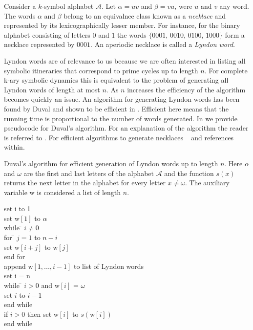 
Consider a $k$-symbol alphabet $\mathcal{A}$. Let
$\alpha=uv$ and $\beta=vu$, were $u$ and $v$ any word. The words $\alpha$
and $\beta$ belong to an equivalnce class known as a \emph{necklace} and 
represented by its 
lexicographically lesser member. 
For instance, for the binary alphabet consisting of letters $0$ and $1$
the words $\{0001,\, 0010,\, 0100,\, 1000\}$ form a necklace 
represented by $0001$. An aperiodic necklace is called a \emph{Lyndon word}.

Lyndon words are of relevance to us because we are often interested 
in listing all symbolic itineraries that correspond to prime cycles up to
length $n$. For complete k-ary symbolic dynamics this is equivalent to the problem
of generating all Lyndon words of length at most $n$. As $n$ increases the efficiency
of the algorithm becomes quickly an issue. An algorithm for generating Lyndon
words has been found by Duval  and shown to be efficient in .
Efficient here means that the running time is proportional to the number of words generated. 
In  we provide pseudocode for Duval's
algorithm. For an explanation of the algorithm the reader is referred to 
. For efficient algorithms to generate necklaces \cf~ 
and references within.

\begin{table}
	\caption{Duval's algorithm for efficient generation of Lyndon words up to length $n$. 
Here $\alpha$
and $\omega$ are the first and last letters of the alphabet $\mathcal{A}$ and the function $s(x)$
returns the next letter in the alphabet for every letter $x \neq \omega$. The auxiliary variable $\mathrm{w}$ is considered
a list of length $n$.}
\begin{tabbing}
   set i to 1 \\
   set $\mathrm{w}[1]$ to $\alpha$ \\
   while \= $i \neq 0$ \\
    	 \>  for \= $j=1$ to $n-i$ \\
         \>	\>  set $\mathrm{w}[i+j]$ to $\mathrm{w}[j]$ \\
	 \>  end for  \\
         \>  append $\mathrm{w}[1,...,i-1]$ to list of Lyndon words \\ 
         \>  set i = n \\
         \>  while \=  $i > 0$ and $\mathrm{w}[i]$ = $\omega$ \\
         \>       \> set $i$ to $i - 1$ \\
     	 \>  end while	\\	
         \>  if $i > 0$ then set $\mathrm{w}[i]$ to $s(\mathrm{w}[i])$ \\
   end while 
\end{tabbing}

\end{table}



